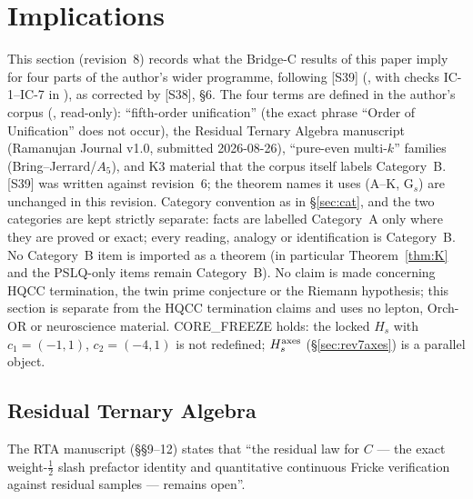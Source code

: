 \section{Implications}\label{sec:rev8impl}
This section (revision~8) records what the Bridge-C results of this paper imply for four parts of the author's wider programme, following [S39] (, with checks IC-1--IC-7 in ), as corrected by [S38], \S6. The four terms are defined in the author's corpus (, read-only): ``fifth-order unification'' (the exact phrase ``Order of Unification'' does not occur), the Residual Ternary Algebra manuscript (Ramanujan Journal v1.0, submitted 2026-08-26), ``pure-even multi-$k$'' families (Bring--Jerrard/$A_5$), and K3 material that the corpus itself labels Category~B. [S39] was written against revision~6; the theorem names it uses (A--K, G$_s$) are unchanged in this revision.
Category convention as in \S\ref{sec:cat}, and the two categories are kept strictly separate: facts are labelled Category~A only where they are proved or exact; every reading, analogy or identification is Category~B. No Category~B item is imported as a theorem (in particular Theorem~\ref{thm:K} and the PSLQ-only items remain Category~B). No claim is made concerning HQCC termination, the twin prime conjecture or the Riemann hypothesis; this section is separate from the HQCC termination claims and uses no lepton, Orch-OR or neuroscience material. CORE\_FREEZE holds: the locked $H_s$ with $c_1=(-1,1)$, $c_2=(-4,1)$ is not redefined; $H_s^{\rm axes}$ (\S\ref{sec:rev7axes}) is a parallel object.

\subsection{Residual Ternary Algebra}\label{sec:rev8rta}
The RTA manuscript (\S\S9--12) states that ``the residual law for $C$ --- the exact weight-$\tfrac12$ slash prefactor identity and quantitative continuous Fricke verification against residual samples --- remains open''.

